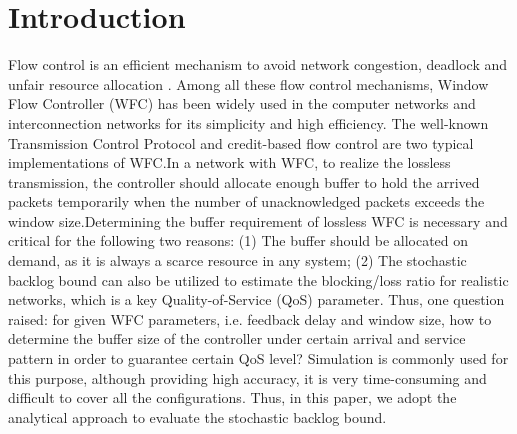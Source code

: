 \documentclass[12pt]{article}
\begin{document}
\section{Introduction}
Flow control is an efficient mechanism to avoid network congestion, deadlock and unfair resource allocation \cite{1094691}. Among all these flow control mechanisms, Window Flow Controller (WFC) has been widely used in the computer networks and interconnection networks for its simplicity and high efficiency. The well-known Transmission Control Protocol \cite{RFC5681} and credit-based flow control \cite{372658,DaTo04} are two typical implementations of WFC.\@ In a network with WFC, to realize the lossless transmission, the controller should allocate enough buffer to hold the arrived packets temporarily when the number of unacknowledged packets exceeds the window size.\@ Determining the buffer requirement of lossless WFC is necessary and critical for the following two reasons: (1) The buffer should be allocated on demand, as it is always a scarce resource in any system; (2) The stochastic backlog bound can also be utilized to estimate the blocking/loss ratio for realistic networks, which is a key Quality-of-Service (QoS) parameter. Thus, one question raised: for given WFC parameters, i.e. feedback delay and window size, how to determine the buffer size of the controller under certain arrival and service pattern in order to guarantee certain QoS level? Simulation is commonly used for this purpose, although providing high accuracy, it is very time-consuming and difficult to cover all the configurations. Thus, in this paper, we adopt the analytical approach to evaluate the stochastic backlog bound.
\end{document}

